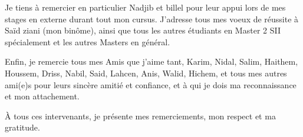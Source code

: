 Je tiens à  remercier en particulier Nadjib et billel pour leur appui lors de mes stages en externe durant tout mon cursus.
J'adresse tous mes voeux de réussite à Saïd ziani (mon binôme), ainsi que tous les autres étudiants en Master 2 SII spécialement et les autres Masters en général.

Enfin, je remercie tous mes Amis que j’aime tant, Karim, Nidal, Salim, Haithem, Houssem, Driss, Nabil, Said, Lahcen, Anis, Walid, Hichem, et tous mes autres ami(e)s pour leurs sincère amitié et confiance, et à qui je dois ma reconnaissance et mon attachement.

À tous ces intervenants, je présente mes remerciements, mon respect et ma gratitude.